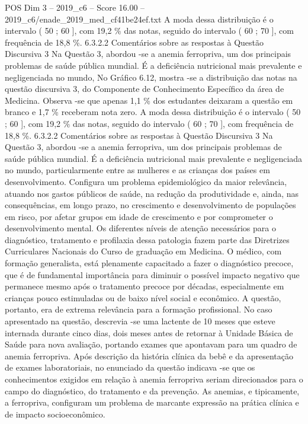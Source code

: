 \begin{textsample}{POS Dim 3 – 2019\_c6 – Score 16.00 – 2019\_c6/enade\_2019\_med\_cf41be24ef.txt}
A moda dessa distribuição é o intervalo ( 50 ; 60 ], com 19,2 \% das notas, seguido do intervalo ( 60 ; 70 ], com frequência de 18,8 \%. 6.3.2.2 Comentários sobre as respostas à Questão Discursiva 3 Na Questão 3, abordou -se a anemia ferropriva, um dos principais problemas de saúde pública mundial.
É a deficiência nutricional mais prevalente e negligenciada no mundo, No Gráfico 6.12, mostra -se a distribuição das notas na questão discursiva 3, do Componente de Conhecimento Específico da área de Medicina.
Observa -se que apenas 1,1 \% dos estudantes deixaram a questão em branco e 1,7 \% receberam nota zero.
A moda dessa distribuição é o intervalo ( 50 ; 60 ], com 19,2 \% das notas, seguido do intervalo ( 60 ; 70 ], com frequência de 18,8 \%. 6.3.2.2 Comentários sobre as respostas à Questão Discursiva 3 Na Questão 3, abordou -se a anemia ferropriva, um dos principais problemas de saúde pública mundial.
É a deficiência nutricional mais prevalente e negligenciada no mundo, particularmente entre as mulheres e as crianças dos países em desenvolvimento.
Configura um problema epidemiológico da maior relevância, atuando nos gastos públicos de saúde, na redução da produtividade e, ainda, nas consequências, em longo prazo, no crescimento e desenvolvimento de populações em risco, por afetar grupos em idade de crescimento e por comprometer o desenvolvimento mental.
Os diferentes níveis de atenção necessários para o diagnóstico, tratamento e profilaxia dessa patologia fazem parte das Diretrizes Curriculares Nacionais do Curso de graduação em Medicina.
O médico, com formação generalista, está plenamente capacitado a fazer o diagnóstico precoce, que é de fundamental importância para diminuir o possível impacto negativo que permanece mesmo após o tratamento precoce por décadas, especialmente em crianças pouco estimuladas ou de baixo nível social e econômico.
A questão, portanto, era de extrema relevância para a formação profissional.
No caso apresentado na questão, descrevia -se uma lactente de 10 meses que esteve internada durante cinco dias, dois meses antes de retornar à Unidade Básica de Saúde para nova avaliação, portando exames que apontavam para um quadro de anemia ferropriva.
Após descrição da história clínica da bebê e da apresentação de exames laboratoriais, no enunciado da questão indicava -se que os conhecimentos exigidos em relação à anemia ferropriva seriam direcionados para o campo do diagnóstico, do tratamento e da prevenção.
As anemias, e tipicamente, a ferropriva, configuram um problema de marcante expressão na prática clínica e de impacto socioeconômico.

\end{textsample}
